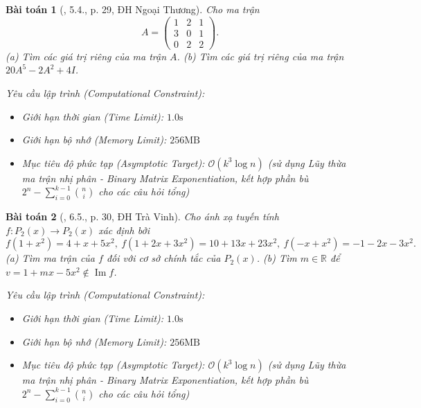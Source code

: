 \documentclass{article}
\newtheorem{baitoan}{Bài toán}
\begin{document}
\begin{baitoan}[\cite{VMS_VMC2024}, 5.4., p. 29, ĐH Ngoại Thương]
	Cho ma trận
	\begin{equation*}
		A = \begin{pmatrix}
			1 & 2 & 1\\3 & 0 & 1\\0 & 2 & 2
		\end{pmatrix}.
	\end{equation*}
	(a) Tìm các giá trị riêng của ma trận $A$. (b) Tìm các giá trị riêng của ma trận $20A^5 - 2A^2 + 4I$.

    \vspace{0.5em}
    \emph{Yêu cầu lập trình (Computational Constraint):}
    \begin{itemize}
        \item Giới hạn thời gian (Time Limit): $1.0\mathrm{s}$
        \item Giới hạn bộ nhớ (Memory Limit): $256\mathrm{MB}$
        \item Mục tiêu độ phức tạp (Asymptotic Target): $\mathcal{O}(k^3 \log n)$ (sử dụng Lũy thừa ma trận nhị phân - Binary Matrix Exponentiation, kết hợp phần bù $2^n - \sum_{i=0}^{k-1} \binom{n}{i}$ cho các câu hỏi tổng)
    \end{itemize}
\end{baitoan}


\begin{baitoan}[\cite{VMS_VMC2024}, 6.5., p. 30, ĐH Trà Vinh]
	Cho ánh xạ tuyến tính $f:P_2(x)\to P_2(x)$ xác định bởi
	\begin{equation*}
		f(1 + x^2) = 4 + x + 5x^2,\ f(1 + 2x + 3x^2) = 10 + 13x + 23x^2,\ f(-x + x^2) = -1 - 2x - 3x^2.
	\end{equation*}
	(a) Tìm ma trận của $f$ đối với cơ sở chính tắc của $P_2(x)$. (b) Tìm $m\in\mathbb{R}$ để $v = 1 + mx - 5x^2\notin\operatorname{Im}f$.

    \vspace{0.5em}
    \emph{Yêu cầu lập trình (Computational Constraint):}
    \begin{itemize}
        \item Giới hạn thời gian (Time Limit): $1.0\mathrm{s}$
        \item Giới hạn bộ nhớ (Memory Limit): $256\mathrm{MB}$
        \item Mục tiêu độ phức tạp (Asymptotic Target): $\mathcal{O}(k^3 \log n)$ (sử dụng Lũy thừa ma trận nhị phân - Binary Matrix Exponentiation, kết hợp phần bù $2^n - \sum_{i=0}^{k-1} \binom{n}{i}$ cho các câu hỏi tổng)
    \end{itemize}
\end{baitoan}
\end{document}
